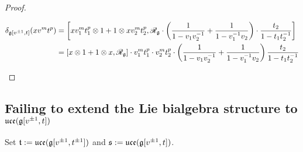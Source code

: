 \begin{proof}
\begin{enumerate}
$$                                \begin{aligned}
                                    \delta_{\g[v^{\pm 1}, t]}( x v^m t^p ) & = \left[x v_1^m t_1^p \tensor 1 + 1 \tensor x v_2^m t_2^p, \scrR_{\g} \cdot \left( \frac{1}{1 - v_1 v_2^{-1}} + \frac{1}{1 - v_1^{-1} v_2} \right) \cdot \frac{t_2}{1 - t_1 t_2^{-1}}\right]
                                    \\
                                    & = [x \tensor 1 + 1 \tensor x, \scrR_{\g}] \cdot v_1^m t_1^p \cdot v_2^m t_2^p \cdot \left( \frac{1}{1 - v_1 v_2^{-1}} + \frac{1}{1 - v_1^{-1} v_2} \right) \frac{t_2}{1 - t_1 t_2^{-1}}
                                \end{aligned}
                            $$
                    \end{enumerate}
                \end{proof}

        \subsection{Failing to extend the Lie bialgebra structure to \texorpdfstring{$\mathfrak{uce}( \mathfrak{g}[v^{\pm 1}, t] )$}{}}
            \begin{convention}
                Set $\mathfrak{t} := \mathfrak{uce}( \mathfrak{g}[v^{\pm 1}, t^{\pm 1}] )$ and $\mathfrak{s} := \mathfrak{uce}( \mathfrak{g}[v^{\pm 1}, t] )$. 
            \end{convention}
        
